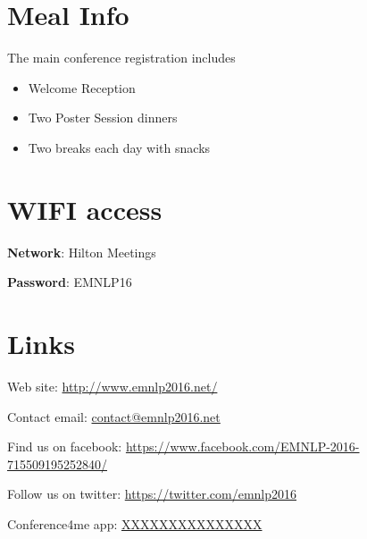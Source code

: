 \normalsize

\clearpage{}


\section*{Meal Info}

The main conference registration includes
\begin{itemize}
\item Welcome Reception
\item Two Poster Session dinners  
\item Two breaks each day with snacks
\end{itemize}

\section*{WIFI access}

\textbf{Network}: Hilton Meetings

\textbf{Password}: EMNLP16


\section*{Links}

Web site: \url{http://www.emnlp2016.net/}

Contact email: \url{contact@emnlp2016.net}

Find us on facebook: \url{https://www.facebook.com/EMNLP-2016-715509195252840/}

Follow us on twitter: \url{https://twitter.com/emnlp2016}


Conference4me app: \url{XXXXXXXXXXXXXXX}

\clearpage{}\thispagestyle{empty}